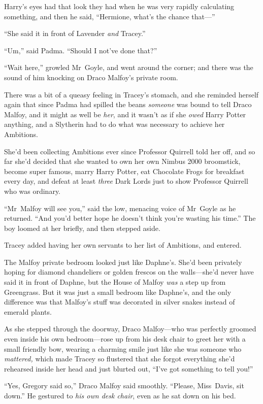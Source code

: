 Harry’s eyes had that look they had when he was very rapidly calculating something, and then he said, “Hermione, what’s the chance that—”

“She said it in front of Lavender \emph{and} Tracey.”

“Um,” said Padma. “Should I not’ve done that?”

\later

“Wait here,” growled Mr~Goyle, and went around the corner; and there was the sound of him knocking on Draco Malfoy’s private room.

There was a bit of a queasy feeling in Tracey’s stomach, and she reminded herself again that since Padma had spilled the beans \emph{someone} was bound to tell Draco Malfoy, and it might as well be \emph{her}, and it wasn’t as if she \emph{owed} Harry Potter anything, and a Slytherin had to do what was necessary to achieve her Ambitions.

She’d been collecting Ambitions ever since Professor Quirrell told her off, and so far she’d decided that she wanted to own her own Nimbus 2000 broomstick, become super famous, marry Harry Potter, eat Chocolate Frogs for breakfast every day, and defeat at least \emph{three} Dark Lords just to show Professor Quirrell who was ordinary.

“Mr~Malfoy will see you,” said the low, menacing voice of Mr~Goyle as he returned. “And you’d better hope he doesn’t think you’re wasting his time.” The boy loomed at her briefly, and then stepped aside.

Tracey added having her own servants to her list of Ambitions, and entered.

The Malfoy private bedroom looked just like Daphne’s. She’d been privately hoping for diamond chandeliers or golden frescos on the walls—she’d never have said it in front of Daphne, but the House of Malfoy \emph{was} a step up from Greengrass. But it was just a small bedroom like Daphne’s, and the only difference was that Malfoy’s stuff was decorated in silver snakes instead of emerald plants.

As she stepped through the doorway, Draco Malfoy—who was perfectly groomed even inside his own bedroom—rose up from his desk chair to greet her with a small friendly bow, wearing a charming smile just like she was someone who \emph{mattered,} which made Tracey so flustered that she forgot everything she’d rehearsed inside her head and just blurted out, “I’ve got something to tell you!”

“Yes, Gregory said so,” Draco Malfoy said smoothly. “Please, Miss~Davis, sit down.” He gestured to \emph{his own desk chair}, even as he sat down on his bed.

